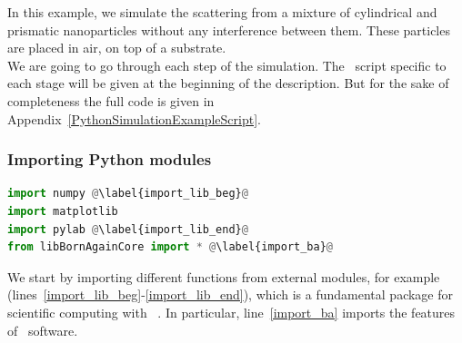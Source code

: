  



In this example, we simulate the scattering from a mixture of
cylindrical and prismatic nanoparticles without any interference
between them. These particles are placed in air, on top
of a substrate.\\ We are going to go through each step of the
simulation. The \Python\ script specific to each stage will be given at
the beginning of the description. But for the sake of completeness the full code is given
in Appendix~\ref{PythonSimulationExampleScript}.


%
\subsubsection{Importing Python modules}
\begin{lstlisting}[language=python, style=eclipseboxed,name=ex1,nolol]
import numpy @\label{import_lib_beg}@
import matplotlib
import pylab @\label{import_lib_end}@
from libBornAgainCore import * @\label{import_ba}@
\end{lstlisting}
We start by importing different functions from external
modules, for example  (lines~\ref{import_lib_beg}-\ref{import_lib_end}), which
is a fundamental package for scientific computing with \Python\
\cite{s:numpy}.  In particular, line~\ref{import_ba}
imports the features of \BornAgain\ software.


%
